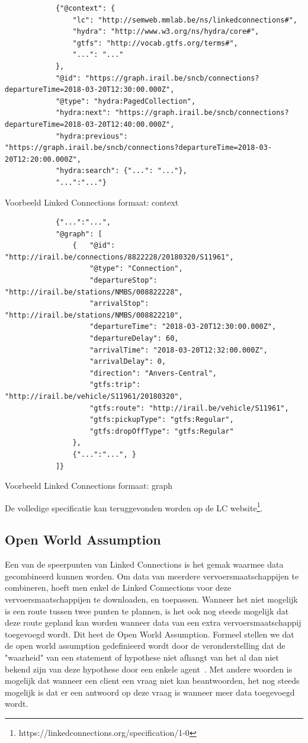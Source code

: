 \begin{listing}[h]
	\begin{verbatim}
			{"@context": {
			    "lc": "http://semweb.mmlab.be/ns/linkedconnections#",
			    "hydra": "http://www.w3.org/ns/hydra/core#",
			    "gtfs": "http://vocab.gtfs.org/terms#",
			    "...": "..."
			},
			"@id": "https://graph.irail.be/sncb/connections?departureTime=2018-03-20T12:30:00.000Z",
			"@type": "hydra:PagedCollection",
			"hydra:next": "https://graph.irail.be/sncb/connections?departureTime=2018-03-20T12:40:00.000Z",
			"hydra:previous": "https://graph.irail.be/sncb/connections?departureTime=2018-03-20T12:20:00.000Z",
			"hydra:search": {"...": "..."},
			"...":"..."}
		\end{verbatim}
	\caption{Voorbeeld Linked Connections formaat: context}
	\label{code:2:linkedconnections-response-context}
\end{listing}
\begin{listing}[h]
	\begin{verbatim}
			{"...":"...",
			"@graph": [
				{   "@id": "http://irail.be/connections/8822228/20180320/S11961",
				    "@type": "Connection",
    				"departureStop": "http://irail.be/stations/NMBS/008822228",
    				"arrivalStop": "http://irail.be/stations/NMBS/008822210",
    				"departureTime": "2018-03-20T12:30:00.000Z",
    				"departureDelay": 60,
    				"arrivalTime": "2018-03-20T12:32:00.000Z",
    				"arrivalDelay": 0,
    				"direction": "Anvers-Central",
    				"gtfs:trip": "http://irail.be/vehicle/S11961/20180320",
    				"gtfs:route": "http://irail.be/vehicle/S11961",
    				"gtfs:pickupType": "gtfs:Regular",
    				"gtfs:dropOffType": "gtfs:Regular"
				},
				{"...":"...", }
			]}
	\end{verbatim}
\caption{Voorbeeld Linked Connections formaat: graph}
\label{code:2:linkedconnections-response-graph}
\end{listing}
 
De volledige specificatie kan teruggevonden worden op de LC website\footnote{https://linkedconnections.org/specification/1-0}.
 
\subsection{Open World Assumption}
Een van de speerpunten van Linked Connections is het gemak waarmee data gecombineerd kunnen worden. Om data van meerdere vervoersmaatschappijen te combineren, hoeft men enkel de Linked Connections voor deze vervoersmaatschappijen te downloaden, en  toepassen. Wanneer het niet mogelijk is een route tussen twee punten te plannen, is het ook nog steeds mogelijk dat deze route gepland kan worden wanneer data van een extra vervoersmaatschappij toegevoegd wordt. Dit heet de Open World Assumption. Formeel stellen we dat de open world assumption gedefinieerd wordt door de veronderstelling dat de "waarheid" van een statement of hypothese niet afhangt van het al dan niet bekend zijn van deze hypothese door een enkele agent~\citep{Moore15}. Met andere woorden is mogelijk dat wanneer een client een vraag niet kan beantwoorden, het nog steeds mogelijk is dat er een antwoord op deze vraag is wanneer meer data toegevoegd wordt.



